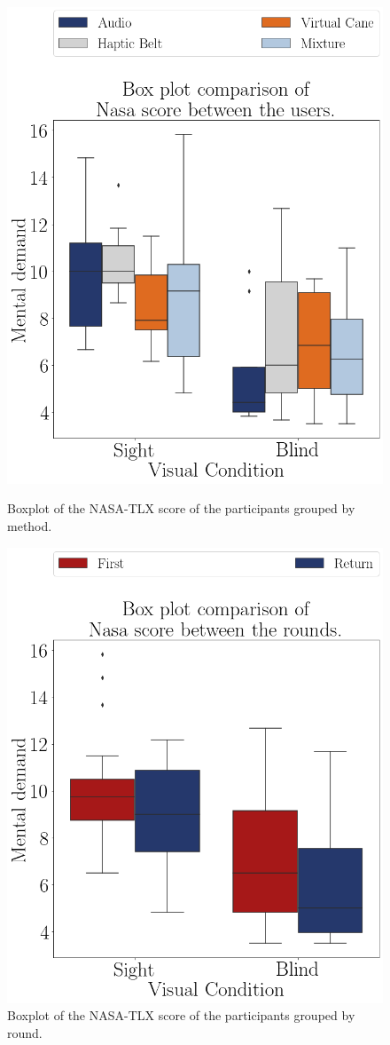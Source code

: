 \begin{figure}[!htb]
    \centering
    \begin{minipage}{0.45\textwidth}
        \centering
        \includegraphics[width = 0.8\linewidth]{Resultados/Nasa/Figuras/png/boxplot_noBase_nasa_4_scene.png}
        \caption{Boxplot of the NASA-TLX score of the participants grouped by method.}
        \label{fig:boxplot_noBase_nasa_4_scene}
    \end{minipage}
    \begin{minipage}{0.45\textwidth}
        \centering
        \includegraphics[width = 0.8\linewidth]{Resultados/Nasa/Figuras/png/boxplot_noBase_nasa_4_rounds.png}
        \caption{Boxplot of the NASA-TLX score of the participants grouped by round.}
        \label{fig:boxplot_noBase_nasa_4_rounds}
    \end{minipage}
\end{figure}

